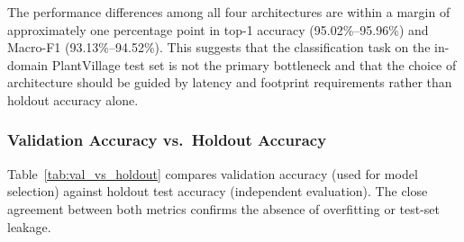 \documentclass[pdflatex,sn-mathphys-num]{sn-jnl}
\theoremstyle{thmstyleone}%
\theoremstyle{thmstyletwo}%
\theoremstyle{thmstylethree}%
\begin{document}
\begin{table}[htbp]
\centering
\caption{Classification performance on the PlantVillage holdout test set (5{,}417 images, 38 classes). All metrics were computed on the reserved test partition under deterministic execution. No test data were used for gradient updates or checkpoint selection.}\label{tab:pv_results}
\end{table}

The performance differences among all four architectures are within a margin of
approximately one percentage point in top-1 accuracy (95.02\%--95.96\%) and Macro-F1
(93.13\%--94.52\%). This suggests that the classification task on the in-domain
PlantVillage test set is not the primary bottleneck and that the choice of architecture
should be guided by latency and footprint requirements rather than holdout accuracy alone.

\subsubsection{Validation Accuracy vs.\ Holdout Accuracy}

Table~\ref{tab:val_vs_holdout} compares validation accuracy (used for model selection)
against holdout test accuracy (independent evaluation). The close agreement between
both metrics confirms the absence of overfitting or test-set leakage.
\end{document}
